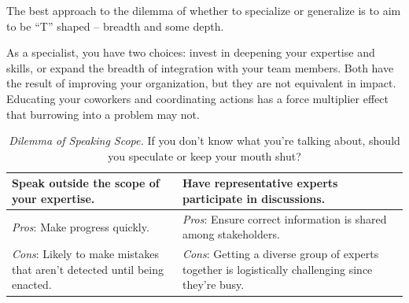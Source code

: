 The best approach to the dilemma of whether to specialize or generalize is to aim to be ``T'' shaped -- breadth and some depth.

As a specialist, you have two choices: invest in deepening your expertise and skills, or expand the breadth of integration with your team members. Both have the result of improving your organization, but they are not equivalent in impact. Educating your coworkers and coordinating actions has a force multiplier effect that burrowing into a problem may not.



\begin{center}
\begin{table}[H] %
\begin{tabular}{ | m{\dilemmatablewidth}| m{\dilemmatablewidth} | }
  \hline
  \textbf{Speak outside the scope of your expertise.} & 
  \textbf{Have representative experts participate in discussions.} \\ 
  \hline
  \textit{Pros}: Make progress quickly. & 
  \textit{Pros}: Ensure correct information is shared among stakeholders. \\  
  \hline
  \textit{Cons}: Likely to make mistakes that aren't detected until being enacted. & 
  \textit{Cons}: Getting a diverse group of experts together is logistically challenging since they're busy. \\  
  \hline
\end{tabular}
\caption{
\textit{Dilemma of Speaking Scope.}
If you don't know what you're talking about, should you speculate or keep your mouth shut?
}
\label{table:dilemma-personal-scope-of-speaking}
\end{table}
\end{center}

